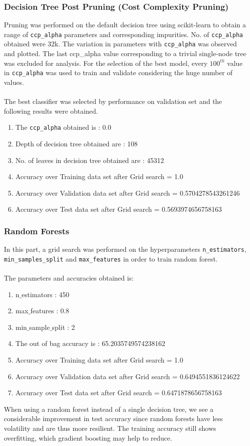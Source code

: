 \documentclass[11pt]{article}
\begin{document}
\subsubsection{Decision Tree Post Pruning (Cost Complexity Pruning)}
Pruning was performed on the default decision tree using scikit-learn to obtain a range of \texttt{ccp\_alpha} parameters and corresponding impurities. No. of \texttt{ccp\_alpha} obtained were 32k. The variation in parameters with \texttt{ccp\_alpha} was observed and plotted. The last ccp\_alpha value corresponding to a trivial single-node tree was excluded for analysis. For the selection of the best model, every $100^{th}$ value in \texttt{ccp\_alpha} was used to train and validate considering the huge number of values. \\
\\
The best classifier was selected by performance on validation set and the following results were obtained.
\begin{enumerate}
\item The \texttt{ccp\_alpha} obtained is : 0.0
\item Depth of decision tree obtained are : 108
\item No. of leaves in decision tree obtained are : 45312
\item Accuracy over Training data set after Grid search = 1.0
\item Accuracy over Validation data set after Grid search = 0.5704278543261246
\item Accuracy over Test data set after Grid search = 0.5693974656758163
\end{enumerate}
\subsubsection{Random Forests}
In this part, a grid search was performed on the hyperparameters \texttt{n\_estimators}, \texttt{min\_samples\_split} and \texttt{max\_features} in order to train random forest. \\
\\
The parameters and accuracies obtained is:
\begin{enumerate}
\item n$\_$estimators : 450
\item max$\_$features : 0.8
\item min$\_$sample$\_$split : 2
\item The out of bag accuracy is : 65.2035749574238162
\item Accuracy over Training data set after Grid search = 1.0
\item Accuracy over Validation data set after Grid search = 0.6494551836124622
\item Accuracy over Test data set after Grid search = 0.6471878656758163
\end{enumerate}
When using a random forest instead of a single decision tree, we see a considerable improvement in test accuracy since random forests have less volatility and are thus more resilient. The training accuracy still shows overfitting, which gradient boosting may help to reduce.
\end{document}
